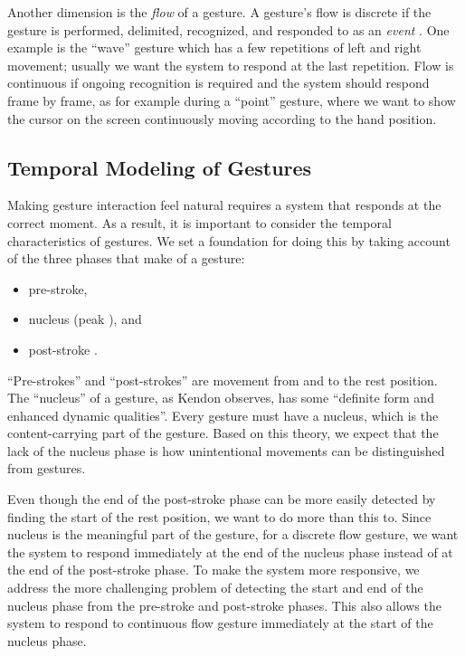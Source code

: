 Another dimension is the \textit{flow} of a gesture. A gesture's flow is
discrete if the gesture is performed, delimited, recognized, and responded to
as an \textit{event} \cite{wobbrock09}. One example is the ``wave'' gesture
which has a few repetitions of left and right movement; usually we want the system to
respond at the last repetition. Flow is continuous if ongoing recognition is required
and the system should respond frame by frame, as for example during a
``point'' gesture, where we want to show the cursor on the screen
continuously moving according to the hand position. 

\subsection{Temporal Modeling of Gestures}
Making gesture interaction feel natural requires a system that responds at the
correct moment. As a result, it is important to consider the temporal
characteristics of gestures. We set a foundation for doing this by taking
account of the three phases that make of a gesture:
\begin{itemize}
  \item pre-stroke,
  \item nucleus (peak \cite{mcneill82}), and
  \item post-stroke \cite{Pavlovic97}.
\end{itemize}

``Pre-strokes'' and ``post-strokes'' are movement from and to the
rest position. The ``nucleus'' of a gesture,
as Kendon \cite{kendon86} observes, has some ``definite form and enhanced dynamic
qualities''. Every gesture must have a nucleus, which is the content-carrying
part of the gesture. Based on this theory, we expect that the lack of the
nucleus phase is how unintentional movements can be distinguished from gestures. 

Even though the end of the
post-stroke phase can be more easily detected by finding the start of the
rest position, we want to do more than this to. Since nucleus is the meaningful
part of the gesture, for a discrete flow gesture, we want the system to respond immediately at the end of the nucleus
phase instead of at the end of the post-stroke phase. To make the system more responsive,
we address the more challenging problem of detecting the start and end of the nucleus phase from the pre-stroke
and post-stroke phases. This also allows the system to respond to continuous
flow gesture immediately at the start of the nucleus phase.

